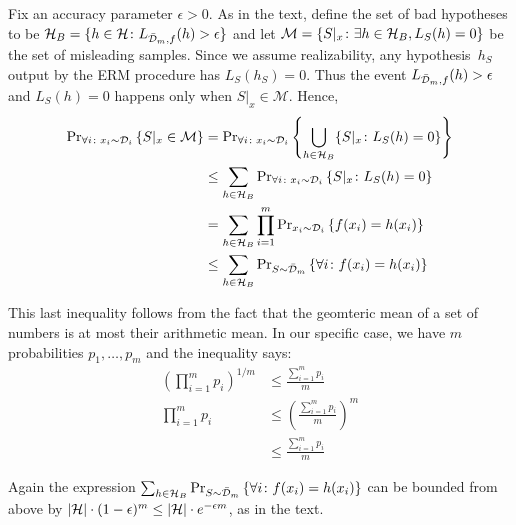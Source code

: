 Fix an accuracy parameter $\epsilon > 0$. As in the text, define the set of bad hypotheses to be $\mathcal{H}_{B} = \{h \in \mathcal{H} \colon L_{\bar{\mathcal{D}}_m, f} (h) > \epsilon\}$ and let $\mathcal{M} = \{S \vert_x \colon \exists h \in \mathcal{H}_{B}, L_S(h) = 0\}$ be the set of misleading samples. Since we assume realizability, any hypothesis~$h_S$ output by the ERM procedure has $L_S(h_S) = 0$. Thus the event 
$L_{\bar{\mathcal{D}}_m, f} (h) > \epsilon$ and $L_S(h) = 0$ happens only when $S \vert_x \in \mathcal{M}$. Hence,
\begin{align*}
	\text{Pr}_{\forall i \colon x_i \sim \mathcal{D}_i} \left \{ S \vert_x \in \mathcal{M} \right \} 
	& = \text{Pr}_{\forall i \colon x_i \sim \mathcal{D}_i} \left \{ \bigcup_{h \in \mathcal{H}_{B}} 
			   \{S \vert_x \colon L_S(h) = 0\} \right \} \\
    & \leq \sum_{h \in \mathcal{H}_B} 
    		\text{Pr}_{\forall i \colon x_i \sim \mathcal{D}_i} \left \{ S \vert_x \colon L_S(h) = 0 \right \} \\
    & = \sum_{h \in \mathcal{H}_B}  
    		\prod_{i = 1}^{m} \text{Pr}_{x_i \sim \mathcal{D}_i} \left \{ f(x_i) = h(x_i) \right \} \\
    & \leq \sum_{h \in \mathcal{H}_B} 
    		\text{Pr}_{S \sim \bar{\mathcal{D}}_m} \left \{ \forall i \colon f(x_i) = h(x_i) \right \}
\end{align*}

This last inequality follows from the fact that the geomteric mean of a set of numbers is at most their arithmetic mean. In our specific case, we have $m$ probabilities $p_1, \ldots, p_m$ and the inequality says:
\begin{align*}
	\left ( \prod_{i = 1}^m p_i \right )^{1 / m} 
			& \leq \frac{\sum_{i = 1}^m p_i}{m} \\
	\prod_{i = 1}^m p_i & \leq \left ( \frac{\sum_{i = 1}^m p_i}{m} \right )^m \\
	                    & \leq \frac{\sum_{i = 1}^m p_i}{m}
\end{align*}

Again the expression $\sum_{h \in \mathcal{H}_B} \text{Pr}_{S \sim \bar{\mathcal{D}}_m} \left \{ \forall i \colon f(x_i) = h(x_i) \right \}$ can be bounded from above by $|\mathcal{H}| \cdot (1 - \epsilon)^m \leq |\mathcal{H}| \cdot e^{- \epsilon m}$, as in the text.

